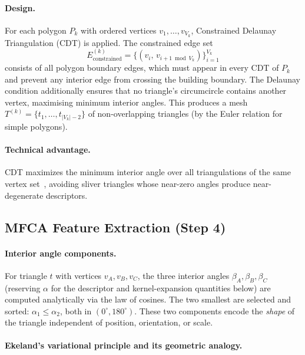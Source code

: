 \documentclass[10pt]{article}
\theoremstyle{plain}
\theoremstyle{definition}
\begin{document}
\paragraph{Design.}
For each polygon $P_k$ with ordered vertices $v_1,\ldots,v_{V_k}$,
Constrained Delaunay Triangulation (CDT) is applied.
The constrained edge set
\begin{equation}
E_{\mathrm{constrained}}^{(k)}
= \bigl\{(v_i,\,v_{i+1 \bmod V_k})\bigr\}_{i=1}^{V_k}
\label{eq:cdt_edges}
\end{equation}
consists of all polygon boundary edges, which must appear in every CDT
of $P_k$ and prevent any interior edge from crossing the building boundary.
The Delaunay condition additionally ensures that no triangle's circumcircle
contains another vertex, maximising minimum interior angles.
This produces a mesh $T^{(k)} = \{t_1,\ldots,t_{|V_k|-2}\}$ of
non-overlapping triangles (by the Euler relation for simple polygons).

\paragraph{Technical advantage.}
CDT maximizes the minimum interior angle over all triangulations of the same
vertex set~\cite{de1997computational}, avoiding sliver triangles whose
near-zero angles produce near-degenerate descriptors.

\subsection{MFCA Feature Extraction (Step 4)}
\label{sec:feat}
\label{sec:mfca}

\paragraph{Interior angle components.}
For triangle $t$ with vertices $v_A,v_B,v_C$, the three interior angles
$\beta_A,\beta_B,\beta_C$ (reserving $\alpha$ for the descriptor and
kernel-expansion quantities below) are computed analytically via the law of
cosines.
The two smallest are selected and sorted:
$\alpha_1 \le \alpha_2$, both in $(0^\circ, 180^\circ)$.
These two components encode the \emph{shape} of the triangle independent of
position, orientation, or scale.

\paragraph{Ekeland's variational principle and its geometric analogy.}
\label{para:ekeland}
\end{document}
